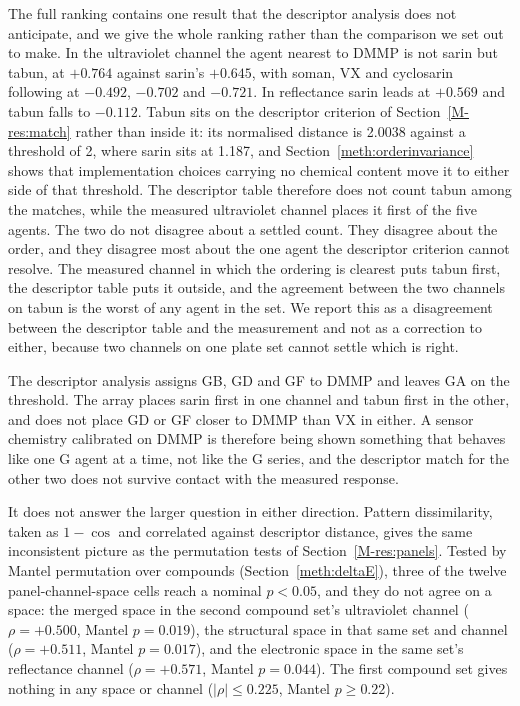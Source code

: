 \documentclass[11pt,a4paper]{article}
\begin{document}
The full ranking contains one result that the descriptor analysis does not
anticipate, and we give the whole ranking rather than the comparison we set out
to make. In the ultraviolet channel the agent nearest to DMMP is not sarin but
tabun, at $+0.764$ against sarin's $+0.645$, with soman, VX and cyclosarin
following at $-0.492$, $-0.702$ and $-0.721$. In reflectance sarin leads at
$+0.569$ and tabun falls to $-0.112$. Tabun sits on the descriptor criterion of
Section~\ref{M-res:match} rather than inside it: its normalised distance is
2.0038 against a threshold of 2, where sarin sits at 1.187, and
Section~\ref{meth:orderinvariance} shows that implementation choices carrying no
chemical content move it to either side of that threshold. The descriptor table
therefore does not count tabun among the matches, while the measured ultraviolet
channel places it first of the five agents. The two do not disagree about a
settled count. They disagree about the order, and they disagree most about the
one agent the descriptor criterion cannot resolve. The measured channel in which
the ordering is clearest puts tabun first, the descriptor table puts it outside, and the agreement between the two channels on tabun is the worst of any
agent in the set.
We report this as a disagreement between the descriptor table and the measurement
and not as a correction to either, because two channels on one plate set cannot
settle which is right.

The descriptor analysis assigns GB, GD and GF to DMMP and leaves GA on the
threshold. The array places sarin first in one channel and tabun first in the
other, and does not place GD or GF closer to DMMP than VX in either. A sensor chemistry calibrated on DMMP is
therefore being shown something that behaves like one G agent at a time, not like
the G series, and the descriptor match for the other two does not survive contact
with the measured response.

It does not answer the larger question in either direction. Pattern
dissimilarity, taken as $1 - \cos$ and correlated against descriptor distance,
gives the same inconsistent picture as the permutation tests of
Section~\ref{M-res:panels}. Tested by Mantel permutation over compounds
(Section~\ref{meth:deltaE}), three of the twelve panel-channel-space cells reach a
nominal $p<0.05$, and they do not agree on a space: the merged space in the
second compound set's ultraviolet channel ($\rho = +0.500$, Mantel $p = 0.019$),
the structural space in that same set and channel ($\rho = +0.511$, Mantel
$p = 0.017$),
and the electronic space in the same set's reflectance channel ($\rho = +0.571$,
Mantel $p = 0.044$). The first compound set gives nothing in any space or
channel ($|\rho| \le 0.225$, Mantel $p \ge 0.22$).
\end{document}
